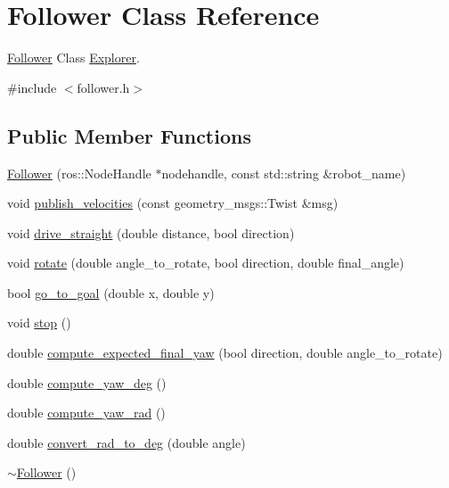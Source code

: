 \hypertarget{class_follower}{}\section{Follower Class Reference}
\label{class_follower}


\hyperlink{class_follower}{Follower} Class \hyperlink{class_explorer}{Explorer}.  




{\ttfamily \#include $<$follower.\+h$>$}

\subsection*{Public Member Functions}
\begin{DoxyCompactItemize}
\item 
\hyperlink{class_follower_a6870e654b7cc901944ead12870a6b107}{Follower} (ros\+::\+Node\+Handle $\ast$nodehandle, const std\+::string \&robot\+\_\+name)
\item 
void \hyperlink{class_follower_aaae1600959a929c269d557d9c09ba777}{publish\+\_\+velocities} (const geometry\+\_\+msgs\+::\+Twist \&msg)
\item 
void \hyperlink{class_follower_ad4d1ce6f43ce65c0aa5a560247ca55ad}{drive\+\_\+straight} (double distance, bool direction)
\item 
void \hyperlink{class_follower_abf8ec0da50295140bf750d30906a726b}{rotate} (double angle\+\_\+to\+\_\+rotate, bool direction, double final\+\_\+angle)
\item 
bool \hyperlink{class_follower_a08ab05cb32f0e6653939163dd22f344a}{go\+\_\+to\+\_\+goal} (double x, double y)
\item 
void \hyperlink{class_follower_a84c17a75630c27bea4f401c8ab8e45b2}{stop} ()
\item 
double \hyperlink{class_follower_a5573bec72ce4aed99706213154849b65}{compute\+\_\+expected\+\_\+final\+\_\+yaw} (bool direction, double angle\+\_\+to\+\_\+rotate)
\item 
double \hyperlink{class_follower_ac988cad87474cb64ef3be7fe197d90a7}{compute\+\_\+yaw\+\_\+deg} ()
\item 
double \hyperlink{class_follower_abde593631e6549062d77fb2169a17c66}{compute\+\_\+yaw\+\_\+rad} ()
\item 
double \hyperlink{class_follower_a670f07466502e1020514d6ba6b928553}{convert\+\_\+rad\+\_\+to\+\_\+deg} (double angle)
\item 
\hyperlink{class_follower_a1dd55289af5ded7a57a2874c5477c33d}{$\sim$\+Follower} ()
\end{DoxyCompactItemize}
